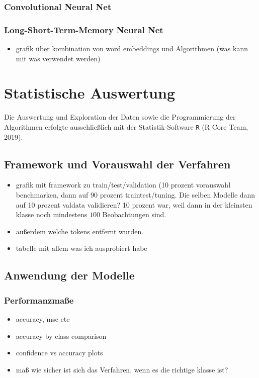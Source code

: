 \documentclass[a4paper,11pt]{article}
\begin{document}
\subsubsection{Convolutional Neural Net}
\subsubsection{Long-Short-Term-Memory Neural Net}

\begin{itemize}
    \item grafik über kombination von word embeddings und Algorithmen (was kann mit was verwendet werden)
\end{itemize}{}


\section{Statistische Auswertung}\label{Kap:statAus}

Die Auswertung und Exploration der Daten sowie die Programmierung der Algorithmen erfolgte ausschließlich mit der Statistik-Software \texttt{R} (R Core Team, 2019).

\subsection{Framework und Vorauswahl der Verfahren}

\begin{itemize}
    \item grafik mit framework zu train/test/validation (10 prozent vorauswahl benchmarken, dann auf 90 prozent traintest/tuning. Die selben Modelle dann auf 10 prozent valdata validieren? 10 prozent war, weil dann in der kleinsten klasse noch mindestens $100$ Beobachtungen sind.
    \item außerdem welche tokens entfernt wurden.
    \item tabelle mit allem was ich ausprobiert habe
\end{itemize}{}

\subsection{Anwendung der Modelle}
\subsubsection{Performanzmaße}

\begin{itemize}
    \item accuracy, mse etc
    \item accuracy by class comparison
    \item confidence vs accuracy plots
    \item maß wie sicher ist sich das Verfahren, wenn es die richtige klasse ist?
\end{itemize}{}
\end{document}
